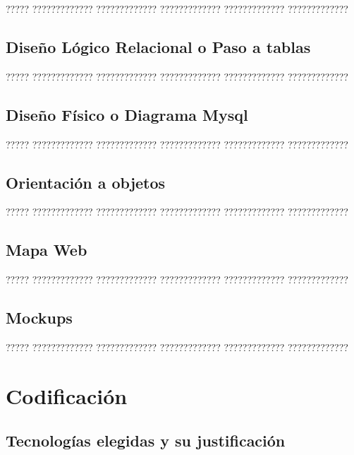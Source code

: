 \documentclass[11pt,spanish,listoffigures,listoftables]{tfgetsinf}
\begin{document}
????? ????????????? ????????????? ????????????? ????????????? ?????????????

\section{Diseño Lógico Relacional o Paso a tablas}

????? ????????????? ????????????? ????????????? ????????????? ?????????????

\section{Diseño Físico o Diagrama Mysql}

????? ????????????? ????????????? ????????????? ????????????? ?????????????

\section{Orientación a objetos}

????? ????????????? ????????????? ????????????? ????????????? ?????????????

\section{Mapa Web}

????? ????????????? ????????????? ????????????? ????????????? ?????????????

\section{Mockups}

????? ????????????? ????????????? ????????????? ????????????? ?????????????

\chapter{Codificación}

\section{Tecnologías elegidas y su justificación}
\end{document}

